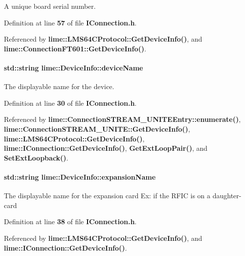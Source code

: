 A unique board serial number. 



Definition at line {\bf 57} of file {\bf I\+Connection.\+h}.



Referenced by {\bf lime\+::\+L\+M\+S64\+C\+Protocol\+::\+Get\+Device\+Info()}, and {\bf lime\+::\+Connection\+F\+T601\+::\+Get\+Device\+Info()}.

\paragraph[{device\+Name}]{\setlength{\rightskip}{0pt plus 5cm}std\+::string lime\+::\+Device\+Info\+::device\+Name}\label{structlime_1_1DeviceInfo_adc3e86d3b4719bd5c9b973107d523d19}


The displayable name for the device. 



Definition at line {\bf 30} of file {\bf I\+Connection.\+h}.



Referenced by {\bf lime\+::\+Connection\+S\+T\+R\+E\+A\+M\+\_\+\+U\+N\+I\+T\+E\+Entry\+::enumerate()}, {\bf lime\+::\+Connection\+S\+T\+R\+E\+A\+M\+\_\+\+U\+N\+I\+T\+E\+::\+Get\+Device\+Info()}, {\bf lime\+::\+L\+M\+S64\+C\+Protocol\+::\+Get\+Device\+Info()}, {\bf lime\+::\+I\+Connection\+::\+Get\+Device\+Info()}, {\bf Get\+Ext\+Loop\+Pair()}, and {\bf Set\+Ext\+Loopback()}.

\paragraph[{expansion\+Name}]{\setlength{\rightskip}{0pt plus 5cm}std\+::string lime\+::\+Device\+Info\+::expansion\+Name}\label{structlime_1_1DeviceInfo_a22f16be6025292a0e024bbd9773d7bf5}
The displayable name for the expansion card Ex\+: if the R\+F\+IC is on a daughter-\/card 

Definition at line {\bf 38} of file {\bf I\+Connection.\+h}.



Referenced by {\bf lime\+::\+L\+M\+S64\+C\+Protocol\+::\+Get\+Device\+Info()}, and {\bf lime\+::\+I\+Connection\+::\+Get\+Device\+Info()}.

